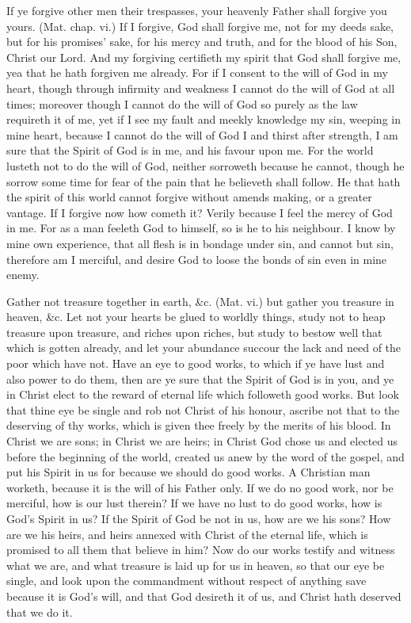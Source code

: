 If ye forgive other men their trespasses, your heavenly 
Father shall forgive you yours. (Mat. chap. vi.) If I 
forgive, God shall forgive me, not for my deeds sake, but 
for his promises' sake, for his mercy and truth, and for the 
blood of his Son, Christ our Lord. And my forgiving
certifieth my spirit that God shall forgive me, yea that he
hath forgiven me already. For if I consent to the will of
God in my heart, though through infirmity and weakness 
I cannot do the will of God at all times; moreover though 
I cannot do the will of God so purely as the law requireth 
it of me, yet if I see my fault and meekly knowledge my 
sin, weeping in mine heart, because I cannot do the will of 
God I and thirst after strength, I am sure that the Spirit of 
God is in me, and his favour upon me. For the world 
lusteth not to do the will of God, neither sorroweth because 
he cannot, though he sorrow some time for fear of the pain 
that he believeth shall follow. He that hath the spirit of 
this world cannot forgive without amends making, or a 
greater vantage. If I forgive now how cometh it? Verily 
because I feel the mercy of God in me. For as a man 
feeleth God to himself, so is he to his neighbour. I know 
by mine own experience, that all flesh is in bondage under 
sin, and cannot but sin, therefore am I merciful, and desire 
God to loose the bonds of sin even in mine enemy. 


Gather not treasure together in earth, \&c. (Mat. vi.)
but gather you treasure in heaven, \&c. Let not your 
hearts be glued to worldly things, study not to heap treasure 
upon treasure, and riches upon riches, but study to bestow 
well that which is gotten already, and let your abundance 
succour the lack and need of the poor which have not. 
Have an eye to good works, to which if ye have lust 
and also power to do them, then are ye sure that the Spirit 
of God is in you, and ye in Christ elect to the reward of 
eternal life which followeth good works. But look that 
thine eye be single and rob not Christ of his honour, 
ascribe not that to the deserving of thy works, which is 
given thee freely by the merits of his blood. In Christ we 
are sons; in Christ we are heirs; in Christ God chose us 
and elected us before the beginning of the world, created 
us anew by the word of the gospel, and put his Spirit in 
us for because we should do good works. A Christian 
man worketh, because it is the will of his Father only. 
If we do no good work, nor be merciful, how is our lust 
therein? If we have no lust to do good works, how is 
God's Spirit in us? If the Spirit of God be not in us, 
how are we his sons? How are we his heirs, and heirs 
annexed with Christ of the eternal life, which is promised 
to all them that believe in him? Now do our works testify
and witness what we are, and what treasure is laid up 
for us in heaven, so that our eye be single, and look upon 
the commandment without respect of anything save because 
it is God's will, and that God desireth it of us, and Christ 
hath deserved that we do it. 

